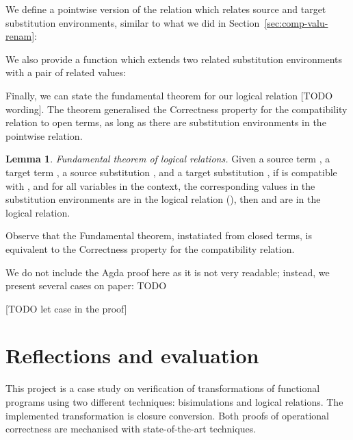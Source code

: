 \documentclass[bsc,frontabs,oneside,singlespacing,parskip,deptreport]{infthesis}
\theoremstyle{definition}
\theoremstyle{lemma}
\newtheorem*{lemma}{Lemma}
\begin{document}

We define a pointwise version of the  relation which
relates source and target substitution environments, similar to what
we did in Section~\ref{sec:comp-valu-renam}:


We also provide a function  which extends two related
substitution environments with a pair of related values:


Finally, we can state the fundamental theorem for our logical
relation [TODO wording]. The theorem generalised the Correctness
property for the compatibility relation to open terms, as long as
there are substitution environments in the pointwise relation.

\begin{lemma}
  \emph{Fundamental theorem of logical relations.} Given a source
  term , a target term , a source substitution
  , and a target substitution , if  is
  compatible with , and for all variables  in the
  context, the corresponding values in the substitution environments
  are in the logical relation (), then
   and  are in the
  logical relation.
\end{lemma}


Observe that the Fundamental theorem, instatiated from closed terms,
is equivalent to the Correctness property for the compatibility relation.

We do not include the Agda proof here as it is not very readable;
instead, we present several cases on paper: TODO

[TODO let case in the proof]

\chapter{Reflections and evaluation}
\label{cha:refl-eval}

This project is a case study on verification of transformations of
functional programs using two different techniques: bisimulations and
logical relations. The implemented transformation is closure
conversion. Both proofs of operational correctness are mechanised with
state-of-the-art techniques.
\end{document}
